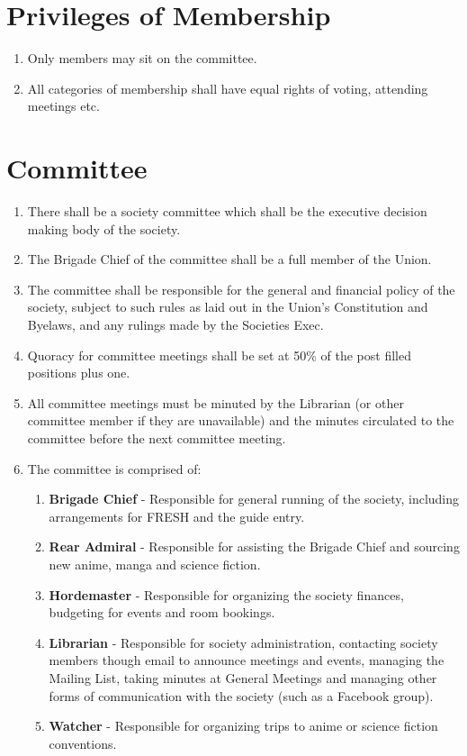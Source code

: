 \documentclass[a4paper,10pt]{article}
\begin{document}
\section{Privileges of Membership}
\begin{enumerate}
  \item Only members may sit on the committee.
  \item All categories of membership shall have equal rights of voting, attending meetings etc.
\end{enumerate}

\section{Committee}
\begin{enumerate}
  \item There shall be a society committee which shall be the executive decision making body of the society.
  \item The Brigade Chief of the committee shall be a full member of the Union.
  \item The committee shall be responsible for the general and financial policy of the society, subject to such rules as laid out in the Union's Constitution and Byelaws, and any rulings made by the Societies Exec.
  \item Quoracy for committee meetings shall be set at 50\% of the post filled positions plus one.
  \item All committee meetings must be minuted by the Librarian (or other committee member if they are unavailable) and the minutes circulated to the committee before the next committee meeting.
  \item The committee is comprised of:
  \begin{enumerate}
    \item \textbf{Brigade Chief} - Responsible for general running of the society, including arrangements for FRESH and the guide entry.
    \item \textbf{Rear Admiral} - Responsible for assisting the Brigade Chief and sourcing new anime, manga and science fiction.
    \item \textbf{Hordemaster} - Responsible for organizing the society finances, budgeting for events and room bookings.
    \item \textbf{Librarian} - Responsible for society administration, contacting society members though email to announce meetings and events, managing the Mailing List, taking minutes at General Meetings and managing other forms of communication with the society (such as a Facebook group).
    \item \textbf{Watcher} - Responsible for organizing trips to anime or science fiction conventions.
  \end{enumerate}
\end{enumerate}
\end{document}
